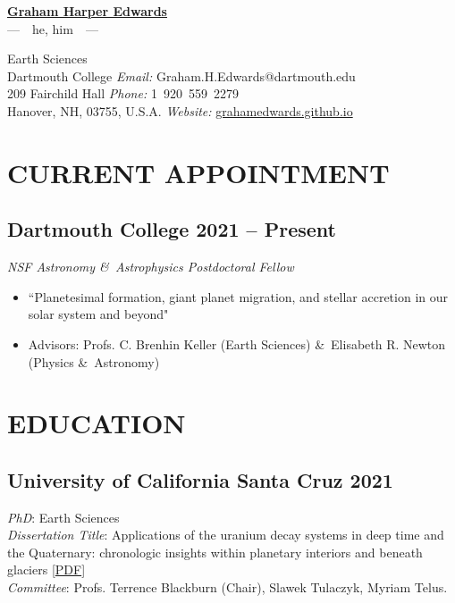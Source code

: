 \documentclass[10pt]{article}
\begin{document}

\begin{center}
\LARGE\textbf{\underline{Graham Harper Edwards}}\\ [.3em]
\large ---~~he, him~~---
\end{center}



Earth Sciences \\
Dartmouth College \hfill \textit{Email:} Graham.H.Edwards@dartmouth.edu \\
209 Fairchild Hall \hfill \textit{Phone:} 1~920~559~2279 \\
Hanover, NH, 03755, U.S.A.	\hfill \textit{Website:} \href{https://grahamedwards.github.io}{grahamedwards.github.io}

\vspace{1em}


\section*{CURRENT APPOINTMENT}
\subsection*{\textbf{Dartmouth College} \hfill 2021 – Present}
\textit{NSF Astronomy \&\ Astrophysics Postdoctoral Fellow}
\begin{itemize}
	\item[] ``Planetesimal formation, giant planet migration, and stellar accretion in our solar system and beyond"
	\item[] Advisors: Profs. C. Brenhin Keller (Earth Sciences) \&\ Elisabeth R. Newton (Physics \&\ Astronomy)
\end{itemize}


\section*{EDUCATION}

\subsection*{\textbf{University of California Santa Cruz} \hfill 2021}
\textit{PhD}: Earth Sciences\\
\textit{Dissertation Title}: Applications of the uranium decay systems in deep time and the Quaternary: chronologic insights within planetary interiors and beneath glaciers [\href{https://escholarship.org/uc/item/0vp7r59z}{PDF}]\\
\textit{Committee}: Profs. Terrence Blackburn (Chair), Slawek Tulaczyk, Myriam Telus.
\end{document}
